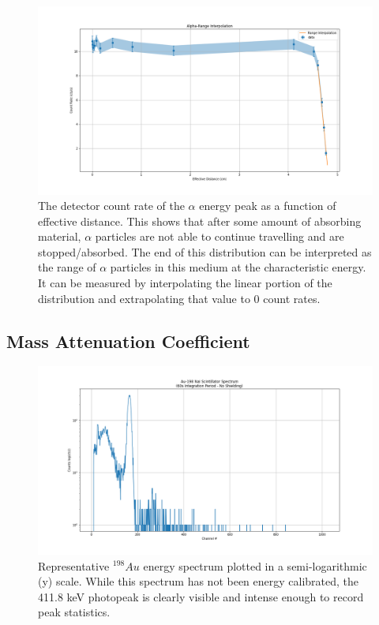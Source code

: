 \begin{figure}
\centering
\includegraphics[width=\textwidth]{count_rate.png}
\caption{The detector count rate of the $\alpha$ energy peak as a function of effective distance. This shows that after some amount of absorbing material, $\alpha$ particles are not able to continue travelling and are stopped/absorbed. The end of this distribution can be interpreted as the range of $\alpha$ particles in this medium at the characteristic energy. It can be measured by interpolating the linear portion of the distribution and extrapolating that value to 0 count rates.}
\label{fig:count-rate}
\end{figure}

\subsection{Mass Attenuation Coefficient}

\begin{figure}
\centering
\includegraphics[width=\textwidth]{au198_spectrum.png}
\caption{Representative ${}^{198}Au$ energy spectrum plotted in a semi-logarithmic (y) scale. While this spectrum has not been energy calibrated, the 411.8 keV photopeak is clearly visible and intense enough to record peak statistics.}
\label{fig:au198-spectrum}
\end{figure}

